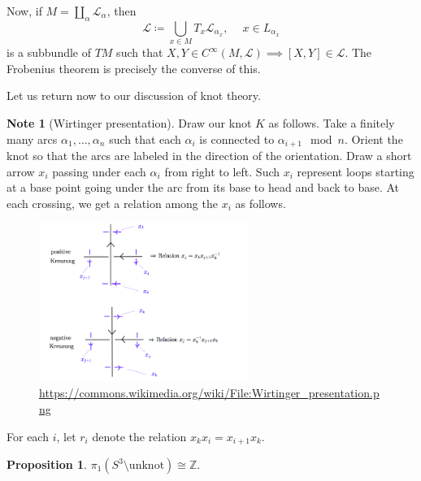 \documentclass[10pt,letterpaper,cm]{nupset}
\theoremstyle{definition}
\newtheorem{note}[definition]{Note}
\theoremstyle{theorem}
\newtheorem{prop}[definition]{Proposition}
\theoremstyle{remark}
\renewcommand{\L}{\mathscr L}
\newcommand{\Z}{\mathbb Z}
\newcommand{\1}{\mathbb{1}}
\newcommand{\0}{\vec 0}
\begin{document}
\medskip

Now, if $M = \coprod_{\alpha} \L_{\alpha}$, then $$\L \coloneqq  \bigcup_{x\in M} T_x \L_{\alpha_x}, \ \quad  x\in L_{\alpha_x}$$ is a subbundle of $TM$ such that $X, Y \in C^{\infty}(M, \L) \implies [X, Y] \in \L$. The Frobenius theorem is precisely the converse of this. 


\bigskip

Let us return now to our discussion of knot theory.

\begin{note}[Wirtinger presentation] 
Draw our knot $K$ as follows. Take a finitely many arcs $\alpha_1, \ldots, \alpha_n$ such that each $\alpha_i$ is connected to $\alpha_{i+1} \mod n$. Orient the knot so that the arcs are labeled in the direction of the orientation. Draw a short arrow $x_i$ passing under each $\alpha_i$ from right to left. Such $x_i$ represent loops starting at a base point going under the arc from its base to head and back to base. At each crossing, we get a relation among the $x_i$ as follows.
\begin{figure}[H]
\centering
\includegraphics[width=68mm]{Wirtinger_presentation.png}
\caption{\url{https://commons.wikimedia.org/wiki/File:Wirtinger_presentation.png} \label{overflow}}
\end{figure}
For each $i$, let $r_i$ denote the relation $x_kx_i = x_{i+1}x_k$.
\end{note}

\begin{prop}
$\pi_1(S^3 \setminus \mathrm{unknot})\cong \Z$.
\end{prop}
\end{document}
